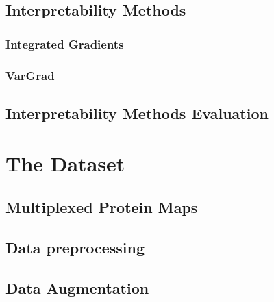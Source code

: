 \documentclass[biblatexBackend=bibtex]{tumthesis}
\begin{document}
\section{Interpretability Methods}
\label{sec:basics:interpretability_methods}


\subsection{Integrated Gradients}
\label{sec:basics:IG}


\subsection{VarGrad}
\label{sec:basics:VarGrad}


\section{Interpretability Methods Evaluation}
\label{sec:basics:vgig_eval}

\chapter{The Dataset}
\label{ch:dataset}


\section{Multiplexed Protein Maps}
\label{sec:dataset:multiplexed_protein_maps}


\section{Data preprocessing}
\label{sec:dataset:data_pp}


\section{Data Augmentation}
\label{sec:dataset:data_augmentation}

\end{document}
